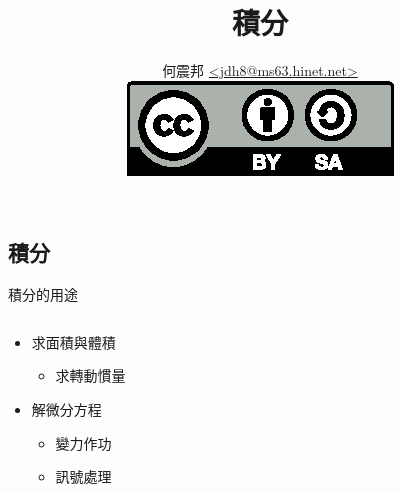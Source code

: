 \documentclass{beamer}
\title{積分}
\author[何震邦]{何震邦 \href{mailto:jdh8@ms63.hinet.net}{\textless jdh8@ms63.hinet.net\textgreater}\\
    \href{http://creativecommons.org/licenses/by-sa/3.0/tw/deed.zh\textunderscore TW}{\includegraphics{by-sa.eps}}}
\theoremstyle{remark}
\begin{document}
\begin{CJK}{UTF8}{bsmi}
\maketitle

\section{積分}
\begin{frame}{積分的用途}
  \begin{columns}
    \begin{column}{0.5\textwidth}
      \begin{itemize}
	\item 求面積與體積
	  \begin{itemize}
	    \item 求轉動慣量
	  \end{itemize}
	\item 解微分方程
	  \begin{itemize}
	    \item 變力作功
	    \item 訊號處理
	  \end{itemize}
      \end{itemize}
    \end{column}
    \begin{column}{0.5\textwidth}
      \begin{center}

\end{center}
\end{column}
\end{columns}
\end{frame}
\end{CJK}
\end{document}
